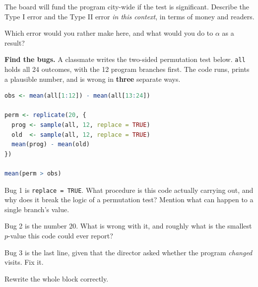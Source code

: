 \documentclass[11pt]{article}
\newcommand{\answerspace}[1]{\vspace{#1}}
\begin{document}
\begin{questions}
\begin{parts}
\item The board will fund the program city-wide if the test is significant. Describe the Type I
error and the Type II error \emph{in this context}, in terms of money and readers.
\answerspace{4.5em}

\item Which error would you rather make here, and what would you do to $\alpha$ as a result?
\answerspace{3.5em}
\end{parts}

\item \textbf{Find the bugs.} A classmate writes the two-sided permutation test below.
\texttt{all} holds all 24 outcomes, with the 12 program branches first. The code runs, prints a
plausible number, and is wrong in \textbf{three} separate ways.

\begin{lstlisting}[language=R]
obs <- mean(all[1:12]) - mean(all[13:24])

perm <- replicate(20, {
  prog <- sample(all, 12, replace = TRUE)
  old  <- sample(all, 12, replace = TRUE)
  mean(prog) - mean(old)
})

mean(perm > obs)
\end{lstlisting}

\begin{parts}
\item Bug 1 is \texttt{replace = TRUE}. What procedure is this code actually carrying out, and why
does it break the logic of a permutation test? Mention what can happen to a single branch's value.
\answerspace{4.5em}

\item Bug 2 is the number $20$. What is wrong with it, and roughly what is the smallest $p$-value
this code could ever report?
\answerspace{4em}

\item Bug 3 is the last line, given that the director asked whether the program \emph{changed}
visits. Fix it.
\answerspace{3.5em}

\item Rewrite the whole block correctly.
\answerspace{6em}
\end{parts}

\end{questions}
\end{document}
